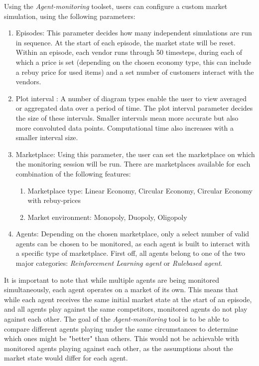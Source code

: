 Using the \emph{Agent-monitoring} toolset, users can configure a custom market simulation, using the following parameters:

\begin{enumerate}
	\item Episodes: This parameter decides how many independent simulations are run in sequence. At the start of each episode, the market state will be reset. Within an episode, each vendor runs through 50 timesteps, during each of which a price is set (depending on the chosen economy type, this can include a rebuy price for used items) and a set number of customers interact with the vendors.
	\item Plot interval : A number of diagram types enable the user to view averaged or aggregated data over a period of time. The plot interval parameter decides the size of these intervals. Smaller intervals mean more accurate but also more convoluted data points. Computational time also increases with a smaller interval size.
	\item Marketplace: Using this parameter, the user can set the marketplace on which the monitoring session will be run. There are marketplaces available for each combination of the following features:
	      \begin{enumerate}
		      \item Marketplace type: Linear Economy, Circular Economy, Circular Economy with rebuy-prices
		      \item Market environment: Monopoly, Duopoly, Oligopoly
	      \end{enumerate}
	\item Agents: Depending on the chosen marketplace, only a select number of valid agents can be chosen to be monitored, as each agent is built to interact with a specific type of marketplace. First off, all agents belong to one of the two major categories: \emph{Reinforcement Learning agent} or \emph{Rulebased agent}.
\end{enumerate}

It is important to note that while multiple agents are being monitored simultaneously, each agent operates on a market of its own. This means that while each agent receives the same initial market state at the start of an episode, and all agents play against the same competitors, monitored agents do not play against each other. The goal of the \emph{Agent-monitoring} tool is to be able to compare different agents playing under the same circumstances to determine which ones might be "better" than others. This would not be achievable with monitored agents playing against each other, as the assumptions about the market state would differ for each agent.

